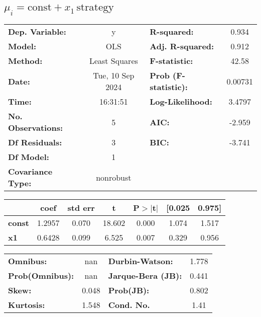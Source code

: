 \documentclass{article}
\begin{document}
\subsection{$\mu_i = \text{const} + x_1\,\text{strategy}$}
\begin{center}
    \begin{tabular}{lclc}
        \toprule
        \textbf{Dep. Variable:}    & y                & \textbf{  R-squared:         } & 0.934   \\
        \textbf{Model:}            & OLS              & \textbf{  Adj. R-squared:    } & 0.912   \\
        \textbf{Method:}           & Least Squares    & \textbf{  F-statistic:       } & 42.58   \\
        \textbf{Date:}             & Tue, 10 Sep 2024 & \textbf{  Prob (F-statistic):} & 0.00731 \\
        \textbf{Time:}             & 16:31:51         & \textbf{  Log-Likelihood:    } & 3.4797  \\
        \textbf{No. Observations:} & 5                & \textbf{  AIC:               } & -2.959  \\
        \textbf{Df Residuals:}     & 3                & \textbf{  BIC:               } & -3.741  \\
        \textbf{Df Model:}         & 1                & \textbf{                     } &         \\
        \textbf{Covariance Type:}  & nonrobust        & \textbf{                     } &         \\
        \bottomrule
    \end{tabular}
    \begin{tabular}{lcccccc}
                       & \textbf{coef} & \textbf{std err} & \textbf{t} & \textbf{P$> |$t$|$} & \textbf{[0.025} & \textbf{0.975]} \\
        \midrule
        \textbf{const} & 1.2957        & 0.070            & 18.602     & 0.000               & 1.074           & 1.517           \\
        \textbf{x1}    & 0.6428        & 0.099            & 6.525      & 0.007               & 0.329           & 0.956           \\
        \bottomrule
    \end{tabular}
    \begin{tabular}{lclc}
        \textbf{Omnibus:}       & nan   & \textbf{  Durbin-Watson:     } & 1.778 \\
        \textbf{Prob(Omnibus):} & nan   & \textbf{  Jarque-Bera (JB):  } & 0.441 \\
        \textbf{Skew:}          & 0.048 & \textbf{  Prob(JB):          } & 0.802 \\
        \textbf{Kurtosis:}      & 1.548 & \textbf{  Cond. No.          } & 1.41  \\
        \bottomrule
    \end{tabular}
\end{center}
\end{document}
